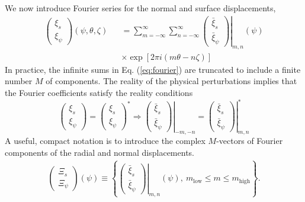 \documentclass[prb,twocolumn,showpacs,preprintnumbers,amsmath,amssymb]{revtex4}
\begin{document}
We now introduce Fourier series for the normal and surface
displacements, 
\begin{eqnarray}
\left( \begin{matrix} \xi_s \\ \xi_\psi \end{matrix} \right)
(\psi,\theta,\zeta) &&= \sum_{m=-\infty}^\infty \sum_{n=-\infty}^\infty
\left. \left( \begin{matrix} \bar{\xi}_s \\ \bar{\xi}_\psi \end{matrix} 
	\right) \right|_{m,n} (\psi) \nonumber \\
&& \times \exp\left[ 2 \pi i \left( m \theta - n \zeta \right) \right]
\label{eq:fourier}
\end{eqnarray}
In practice, the infinite sums in Eq. (\ref{eq:fourier}) are truncated to include a
finite number $M$ of components.  The reality of the physical
perturbations implies that the Fourier coefficients satisfy the reality
conditions
\begin{equation}
\left( \begin{matrix} \xi_s \\ \xi_\psi \end{matrix} \right) 
= \left( \begin{matrix} \xi_s \\ \xi_\psi \end{matrix} \right)^*
\Rightarrow \left. \left( \begin{matrix} \bar{\xi}_s \\ \bar{\xi}_\psi 
	\end{matrix} \right) \right|_{-m,-n}
= \left. \left( \begin{matrix} \bar{\xi}_s \\ \bar{\xi}_\psi 
	\end{matrix} \right) \right|_{m,n}^*
\label{eq:define_xis}
\end{equation}
A useful, compact notation is to introduce the complex $M$-vectors of
Fourier components of the radial and normal displacements.
\begin{eqnarray}
\left( \begin{matrix} \Xi_s \\ \Xi_\psi \end{matrix} \right) (\psi) 
\equiv \left\{ \left. 
	\left( \begin{matrix} \bar{\xi}_s \\ \bar{\xi}_\psi 
	\end{matrix} \right) 
	\right|_{m,n}(\psi),\ m_\textrm{low} \le m \le m_\textrm{high} 
	\right\}. \nonumber \\
\label{eq:Xi_vector}
\end{eqnarray}
\end{document}

